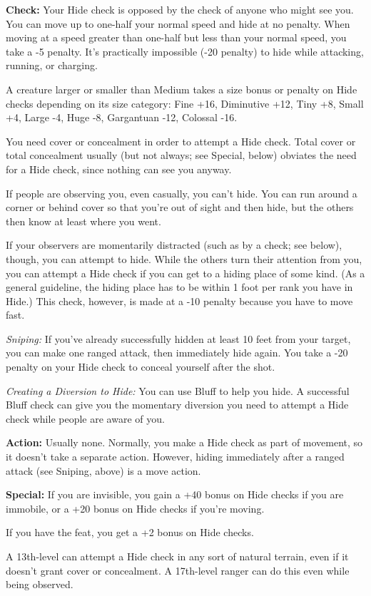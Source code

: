 
\textbf{Check:} Your Hide check is opposed by the  check of anyone who might 
see you. You can move up to one-half your normal speed and hide at no penalty. 
When moving at a speed greater than one-half but less than your normal speed, you 
take a -5 penalty. It's practically impossible (-20 penalty) to hide while attacking, 
running, or charging.

A creature larger or smaller than Medium takes a size bonus or penalty on Hide 
checks depending on its size category: Fine +16, Diminutive +12, Tiny +8, Small 
+4, Large -4, Huge -8, Gargantuan -12, Colossal -16.

You need cover or concealment in order to attempt a Hide check. Total cover or 
total concealment usually (but not always; see Special, below) obviates the need 
for a Hide check, since nothing can see you anyway.

If people are observing you, even casually, you can't hide. You can run around 
a corner or behind cover so that you're out of sight and then hide, but the others 
then know at least where you went.

If your observers are momentarily distracted (such as by a  check; see below), 
though, you can attempt to hide. While the others turn their attention from you, 
you can attempt a Hide check if you can get to a hiding place of some kind. (As 
a general guideline, the hiding place has to be within 1 foot per rank you have 
in Hide.) This check, however, is made at a -10 penalty because you have to move 
fast.

\textit{Sniping:} If you've already successfully hidden at least 10 feet from your 
target, you can make one ranged attack, then immediately hide again. You take a 
-20 penalty on your Hide check to conceal yourself after the shot.

\textit{Creating a Diversion to Hide:} You can use Bluff to help you hide. A successful 
Bluff check can give you the momentary diversion you need to attempt a Hide check 
while people are aware of you.

\textbf{Action:} Usually none. Normally, you make a Hide check as part of movement, 
so it doesn't take a separate action. However, hiding immediately after a ranged 
attack (see Sniping, above) is a move action.

\textbf{Special:} If you are invisible, you gain a +40 bonus on Hide checks if 
you are immobile, or a +20 bonus on Hide checks if you're moving.

If you have the  feat, you get a +2 bonus on Hide checks.

A 13th-level  can attempt a Hide check in any sort of natural terrain, even 
if it doesn't grant cover or concealment. A 17th-level ranger can do this even while 
being observed.
